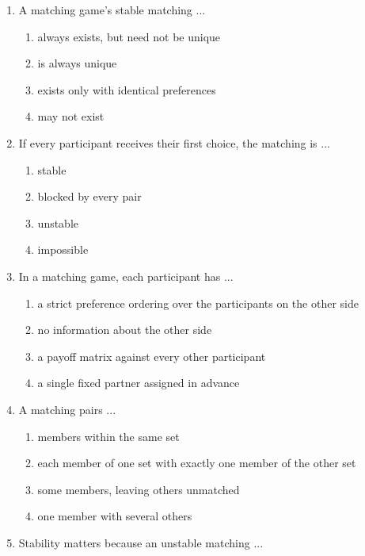 \documentclass[11pt]{article}
\begin{document}
\begin{enumerate}[itemsep=6pt]
  \begin{enumerate}
    \item the proposing side
    \item neither side
    \item both sides equally
    \item the receiving (non-proposing) side
  \end{enumerate}
  \item A matching game's stable matching ...
  \begin{enumerate}
    \item always exists, but need not be unique
    \item is always unique
    \item exists only with identical preferences
    \item may not exist
  \end{enumerate}
  \item If every participant receives their first choice, the matching is ...
  \begin{enumerate}
    \item stable
    \item blocked by every pair
    \item unstable
    \item impossible
  \end{enumerate}
  \item In a matching game, each participant has ...
  \begin{enumerate}
    \item a strict preference ordering over the participants on the other side
    \item no information about the other side
    \item a payoff matrix against every other participant
    \item a single fixed partner assigned in advance
  \end{enumerate}
  \item A matching pairs ...
  \begin{enumerate}
    \item members within the same set
    \item each member of one set with exactly one member of the other set
    \item some members, leaving others unmatched
    \item one member with several others
  \end{enumerate}
  \item Stability matters because an unstable matching ...

\end{enumerate}
\end{document}
